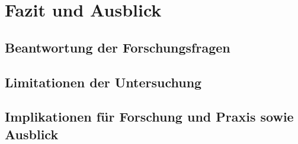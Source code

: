 \section{Fazit und Ausblick}

\subsection{Beantwortung der Forschungsfragen}

\subsection{Limitationen der Untersuchung}

\subsection{Implikationen f\"ur Forschung und Praxis sowie Ausblick}
